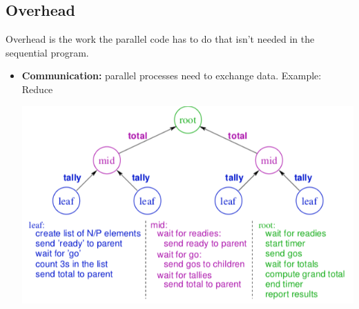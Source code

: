 \documentclass[../main.tex]{subfiles}
\begin{document}
\subsection{Overhead}
Overhead is the work the parallel code has to do that isn't needed in the sequential program.

\begin{itemize}
	\item \textbf{Communication:} parallel processes need to exchange data.
	      Example: Reduce
	      \begin{center}
		      \includegraphics[scale=0.65]{images/scan-communication.png}
	      \end{center}


\end{itemize}
\end{document}
